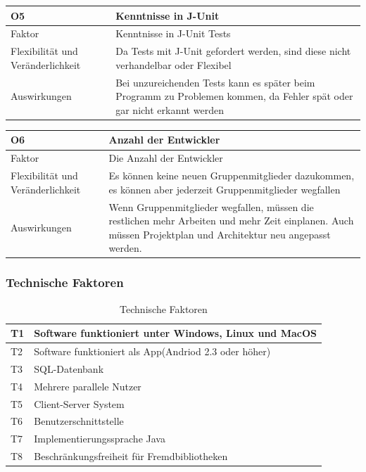\documentclass[fontsize=12pt,paper=a4,twoside]{scrartcl}
\begin{document}
\begin{table}[H]
\begin{tabular}{|p{3cm}|p{12cm}|}\hline
O5 & Kenntnisse in J-Unit \\ \hline
Faktor & Kenntnisse in J-Unit Tests\\ \hline
Flexibilität und Veränderlichkeit & Da Tests mit J-Unit gefordert werden, sind diese nicht verhandelbar oder Flexibel\\ \hline
Auswirkungen & Bei unzureichenden Tests kann es später beim Programm zu Problemen kommen, da Fehler spät oder gar nicht erkannt werden\\ \hline
\end{tabular}
\end{table}

\begin{table}[H]
\begin{tabular}{|p{3cm}|p{12cm}|}\hline
O6 & Anzahl der Entwickler\\ \hline
Faktor & Die Anzahl der Entwickler\\ \hline
Flexibilität und Veränderlichkeit & Es können keine neuen Gruppenmitglieder dazukommen, es können aber jederzeit Gruppenmitglieder wegfallen \\ \hline
Auswirkungen & Wenn Gruppenmitglieder wegfallen, müssen die restlichen mehr Arbeiten und mehr Zeit einplanen. Auch müssen Projektplan und Architektur neu angepasst werden.\\ \hline
\end{tabular}
\end{table}

\subsubsection{Technische Faktoren}
\label{sec:techfaktoren}

\begin{table}[H]
\centering
\caption{Technische Faktoren}
\begin{tabular}{|l|l|} \hline
T1 & Software funktioniert unter Windows, Linux und MacOS \\ \hline
T2 & Software funktioniert als App(Andriod 2.3 oder höher) \\ \hline
T3 & SQL-Datenbank \\ \hline
T4 & Mehrere parallele Nutzer \\ \hline
T5 & Client-Server System \\ \hline
T6 & Benutzerschnittstelle \\ \hline
T7 & Implementierungssprache Java \\ \hline
T8 &  Beschränkungsfreiheit für Fremdbibliotheken\\ \hline
\end{tabular}
\end{table}
\end{document}
